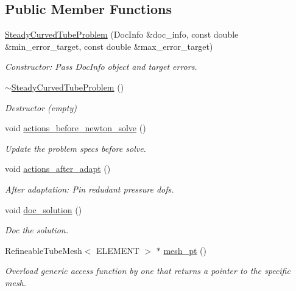 \subsection*{Public Member Functions}
\begin{DoxyCompactItemize}
\item 
\hyperlink{classSteadyCurvedTubeProblem_ac276276fa87e57ff486e3af24b72e38b}{Steady\+Curved\+Tube\+Problem} (Doc\+Info \&doc\+\_\+info, const double \&min\+\_\+error\+\_\+target, const double \&max\+\_\+error\+\_\+target)
\begin{DoxyCompactList}\small\item\em Constructor\+: Pass Doc\+Info object and target errors. \end{DoxyCompactList}\item 
\hyperlink{classSteadyCurvedTubeProblem_a1adfde23500217008be5445934830115}{$\sim$\+Steady\+Curved\+Tube\+Problem} ()
\begin{DoxyCompactList}\small\item\em Destructor (empty) \end{DoxyCompactList}\item 
void \hyperlink{classSteadyCurvedTubeProblem_a90f3197b2cd58a6d24d7064018db3bac}{actions\+\_\+before\+\_\+newton\+\_\+solve} ()
\begin{DoxyCompactList}\small\item\em Update the problem specs before solve. \end{DoxyCompactList}\item 
void \hyperlink{classSteadyCurvedTubeProblem_a536ebee9cdb86bb1533531c85e5fd125}{actions\+\_\+after\+\_\+adapt} ()
\begin{DoxyCompactList}\small\item\em After adaptation\+: Pin redudant pressure dofs. \end{DoxyCompactList}\item 
void \hyperlink{classSteadyCurvedTubeProblem_a544bdf06e254393094a39561944af6b7}{doc\+\_\+solution} ()
\begin{DoxyCompactList}\small\item\em Doc the solution. \end{DoxyCompactList}\item 
Refineable\+Tube\+Mesh$<$ E\+L\+E\+M\+E\+NT $>$ $\ast$ \hyperlink{classSteadyCurvedTubeProblem_ae31d15be72aabd7fe088499edd715d09}{mesh\+\_\+pt} ()
\begin{DoxyCompactList}\small\item\em Overload generic access function by one that returns a pointer to the specific mesh. \end{DoxyCompactList}\end{DoxyCompactItemize}

